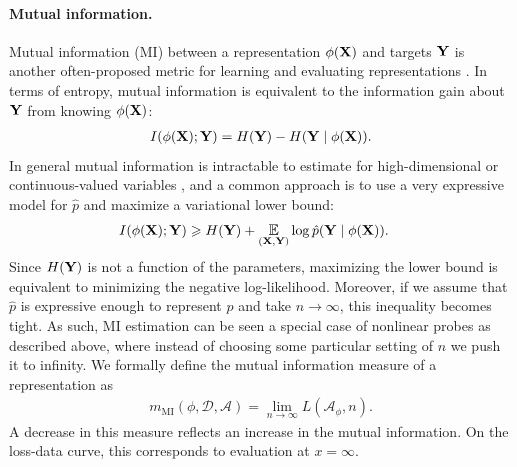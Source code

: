 \paragraph{Mutual information.}
Mutual information (MI) between a representation $\phi({\mathbf{X}})$ and targets ${\mathbf{Y}}$ is another often-proposed metric for learning and evaluating representations \citep{Pimentel2020InformationTheoreticPF, bachman2019learning}.
In terms of entropy, mutual information is equivalent to the information gain about ${\mathbf{Y}}$ from knowing $\phi({\mathbf{X}})$:
\begin{align}
    I(\phi({\mathbf{X}}); {\mathbf{Y}}) = H({\mathbf{Y}}) - H({\mathbf{Y}} \mid \phi({\mathbf{X}})).
\end{align}
In general mutual information is intractable to estimate for high-dimensional or continuous-valued variables \citep{McAllester2018FormalLO}, and a common approach is to use a very expressive model for $\hat{p}$ and maximize a variational lower bound:
\begin{align}
    I(\phi(\rmX); \rmY) &\ge H(\rmY) + \E_{(\rmX, \rmY)} \log \hat{p}(\rmY \mid \phi(\rmX)).
\end{align}
Since $H({\mathbf{Y}})$ is not a function of the parameters, maximizing the lower bound is equivalent to minimizing the negative log-likelihood.
Moreover, if we assume that $ \hat p$ is expressive enough to represent $ p$ and take $ n \to \infty$, this inequality becomes tight.
As such, MI estimation can be seen a special case of nonlinear probes as described above, where instead of choosing some particular setting of $n$ we push it to infinity. We formally define the mutual information measure of a representation as
\begin{align}
    m_{\mathrm{MI}}(\phi, \mathcal{D}, \mathcal{A}) = \lim_{n\to \infty} L(\mathcal{A}_\phi, n).
\end{align}
A decrease in this measure reflects an increase in the mutual information.
On the loss-data curve, this corresponds to evaluation at $ x= \infty$.


